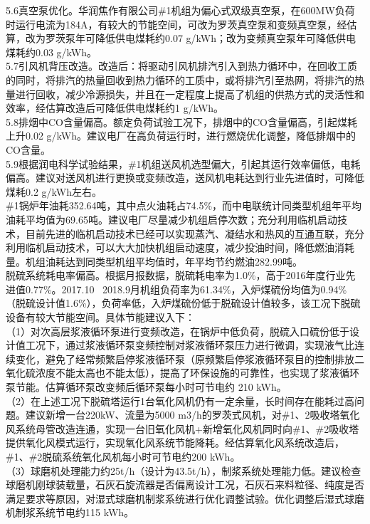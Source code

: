 \documentclass[a4paper, 11pt]{article}
\begin{document}
\indent
5.6真空泵优化。华润焦作有限公司\#1机组为偏心式双级真空泵，在600MW负荷时运行电流为184A，有较大的节能空间，可改为罗茨真空泵和变频真空泵，经估算，改为罗茨泵年可降低供电煤耗约0.07 g/kWh；改为变频真空泵年可降低供电煤耗约0.03 g/kWh。\\
\indent
5.7引风机背压改造。改造后：将驱动引风机排汽引入到热力循环中，在回收工质的同时，将排汽的热量回收到热力循环的工质中，或将排汽引至热网，将排汽的热量进行回收，减少冷源损失，并且在一定程度上提高了机组的供热方式的灵活性和效率，经估算改造后可降低供电煤耗约1 g/kWh。\\
\indent
	5.8排烟中CO含量偏高。额定负荷试验工况下，排烟中的CO含量偏高，引起煤耗上升0.02 g/kWh。建议电厂在高负荷运行时，进行燃烧优化调整，降低排烟中的CO含量。\\
\indent
5.9根据润电科学试验结果，\#1机组送风机选型偏大，引起其运行效率偏低，电耗偏高。建议对送风机进行更换或变频改造，送风机电耗达到行业先进值时，可降低煤耗0.2 g/kWh左右。\\
 \#1锅炉年油耗352.64吨，其中点火油耗占74.5\%，而中电联统计同类型机组年平均油耗平均值为69.65吨。建议电厂尽量减少机组启停次数；充分利用临机启动技术，目前先进的临机启动技术已经可以实现蒸汽、凝结水和热风的互通互联，充分利用临机启动技术，可以大大加快机组启动速度，减少投油时间，降低燃油消耗量。机组油耗达到同类型机组平均值时，年平均节约燃油282.99吨。\\
 脱硫系统耗电率偏高。根据月报数据，脱硫耗电率为1.0\%，高于2016年度行业先进值0.77\%。2017.10 ~2018.9月机组负荷率为61.34\%，入炉煤硫份均值为0.94\%（脱硫设计值1.6\%），负荷率低，入炉煤硫份低于脱硫设计值较多，该工况下脱硫设备有较大节能空间。具体节能建议入下：\\
\indent
（1）对次高层浆液循环泵进行变频改造，在锅炉中低负荷，脱硫入口硫份低于设计值工况下，通过浆液循环泵变频控制对浆液循环泵压力进行微调，实现液气比连续变化，避免了经常频繁启停浆液循环泵（原频繁启停浆液循环泵目的控制排放二氧化硫浓度不能太高也不能太低），提高了环保设施的可靠性，也实现了浆液循环泵节能。估算循环泵改变频后循环泵每小时可节电约 210 kWh。\\
\indent
（2）在上述工况下脱硫塔运行1台氧化风机仍有一定余量，长时间存在能耗过高问题。建议新增一台220kW、流量为5000 m3/h的罗茨式风机，对\#1、2吸收塔氧化风系统母管改造连通，实现一台旧氧化风机+新增氧化风机同时向\#1、\#2吸收塔提供氧化风模式运行，实现氧化风系统节能降耗。经估算氧化风系统改造后，\#1、\#2脱硫系统氧化风机每小时可节电约200 kWh。\\
\indent
（3）球磨机处理能力约25t/h（设计为43.5t/h），制浆系统处理能力低。建议检查球磨机刚球装载量，石灰石旋流器是否偏离设计工况，石灰石来料粒径、纯度是否满足要求等原因，对湿式球磨机制浆系统进行优化调整试验。优化调整后湿式球磨机制浆系统节电约115 kWh。\\
\end{document}
